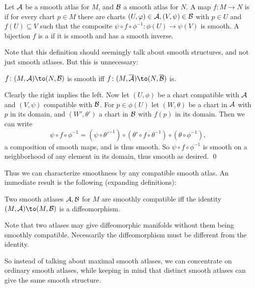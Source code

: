 \eproof

\bdefn

    Let ${{\cal A}}$ be a smooth atlas for $M$, and ${{\cal B}}$ a smooth atlas for $N$.
    A map $f\colon M\to N$ is  if for every chart $p\in M$ there are charts $(U,\varphi)\in{{\cal A}},(V,\psi)\in{{\cal B}}$ with $p\in U$ and $f(U)\subseteq V$ such that
    the composite $\psi\circ f\circ\phi^{-1}\colon\phi(U)\to\psi(V)$ is smooth.
    A bijection $f$ is a  if it is smooth and has a smooth inverse.

\edefn

Note that this definition should seemingly talk about smooth structures, and not just smooth atlases.
But this is unnecessary:

\bprop

    $f\colon(M,\A)\to(N,\B)$ is smooth iff $f\colon(M,\cl\A)\to(N,\cl\B)$ is.

\eprop

\bproof

    Clearly the right implies the left.
    Now let $(U,\phi)$ be a chart compatible with ${{\cal A}}$ and $(V,\psi)$ compatible with ${{\cal B}}$.
    For $p\in\phi(U)$ let $(W,\theta)$ be a chart in ${{\cal A}}$ with $p$ in its domain, and $(W',\theta')$ a chart in ${{\cal B}}$ with $f(p)$ in its domain.
    Then we can write
    $$ \psi\circ f\circ\phi^{-1} = (\psi\circ{\theta'}^{-1})\circ(\theta'\circ f\circ\theta^{-1})\circ(\theta\circ\phi^{-1}), $$
    a composition of smooth maps, and is thus smooth.
    So $\psi\circ f\circ\phi^{-1}$ is smooth on a neighborhood of any element in its domain, thus smooth as desired.
    \qed

\eproof

Thus we can characterize smoothness by any compatible smooth atlas.
An immediate result is the following (expanding definitions):

\blemm

    Two smooth atlases ${{\cal A}},{{\cal B}}$ for $M$ are smoothly compatible iff the identity $(M,\A)\to(M,\B)$ is a diffeomorphism.

\elemm

Note that two atlases may give diffeomorphic manifolds without them being smoothly compatible.
Necessarily the diffeomorphism must be different from the identity.

So instead of talking about maximal smooth atlases, we can concentrate on ordinary smooth atlases, while keeping in mind that distinct smooth atlases can give the same smooth structure.

\bexam

